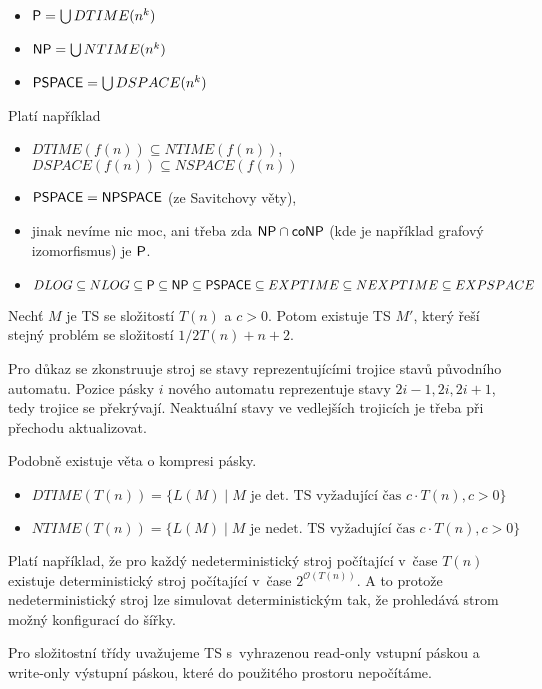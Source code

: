 \begin{itemize}
    \item $\P = \bigcup DTIME(n^k)$
    \item $\NP = \bigcup NTIME(n^k)$
    \item $\PSPACE = \bigcup DSPACE(n^k)$
\end{itemize}
Platí například
\begin{itemize}
	\item $DTIME(f(n)) \subseteq NTIME(f(n))$, $DSPACE(f(n)) \subseteq NSPACE(f(n))$
    \item $\PSPACE = \NPSPACE$ (ze Savitchovy věty),
    \item jinak nevíme nic moc, ani třeba zda $\NP \cap \coNP$ (kde je
        například grafový izomorfismus) je $\P$.
	\item $DLOG \subseteq NLOG \subseteq \P \subseteq \NP \subseteq \PSPACE \subseteq EXPTIME \subseteq NEXPTIME \subseteq EXPSPACE$
\end{itemize}

\begin{theorem}
    Nechť $M$ je TS se složitostí $T(n)$ a $c > 0$.
    Potom existuje TS $M'$, který řeší stejný problém
    se složitostí $1/2 T(n) + n + 2$.
\end{theorem}

Pro důkaz se zkonstruuje stroj se stavy reprezentujícími trojice stavů
původního automatu. Pozice pásky $i$ nového automatu reprezentuje stavy
$2i-1, 2i, 2i+1$, tedy trojice se překrývají. Neaktuální stavy ve
vedlejších trojicích je třeba při přechodu aktualizovat.

Podobně existuje věta o kompresi pásky.

\begin{itemize}
    \item $DTIME(T(n)) = \{ L(M) \mid \text{$M$ je det. TS vyžadující
        čas $c \cdot T(n)$}, c > 0 \}$
    \item $NTIME(T(n)) = \{ L(M) \mid \text{$M$ je nedet. TS vyžadující
    čas } c \cdot T(n), c > 0 \}$
\end{itemize}

Platí například, že pro každý nedeterministický stroj počítající v~čase
$T(n)$ existuje deterministický stroj počítající v~čase
$2^{\mathcal{O}(T(n))}$. A to protože nedeterministický stroj lze
simulovat deterministickým tak, že prohledává strom možný konfigurací do
šířky.

Pro složitostní třídy uvažujeme TS s~vyhrazenou read-only vstupní páskou
a write-only výstupní páskou, které do použitého prostoru nepočítáme.

